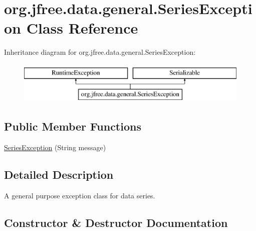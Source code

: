 \hypertarget{classorg_1_1jfree_1_1data_1_1general_1_1_series_exception}{}\section{org.\+jfree.\+data.\+general.\+Series\+Exception Class Reference}
\label{classorg_1_1jfree_1_1data_1_1general_1_1_series_exception}
Inheritance diagram for org.\+jfree.\+data.\+general.\+Series\+Exception\+:\begin{figure}[H]
\begin{center}
\leavevmode
\includegraphics[height=2.000000cm]{classorg_1_1jfree_1_1data_1_1general_1_1_series_exception}
\end{center}
\end{figure}
\subsection*{Public Member Functions}
\begin{DoxyCompactItemize}
\item 
\mbox{\hyperlink{classorg_1_1jfree_1_1data_1_1general_1_1_series_exception_a0edf169075006b49f4cc1ae20dfa63af}{Series\+Exception}} (String message)
\end{DoxyCompactItemize}


\subsection{Detailed Description}
A general purpose exception class for data series. 

\subsection{Constructor \& Destructor Documentation}
\mbox{\label{classorg_1_1jfree_1_1data_1_1general_1_1_series_exception_a0edf169075006b49f4cc1ae20dfa63af}} 
